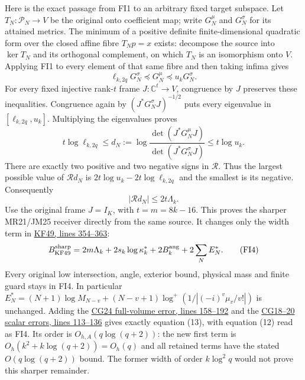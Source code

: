 \documentclass[11pt]{article}
\begin{document}
Here is the exact passage from FI1 to an arbitrary fixed target subspace. Let \(T_N:\mathcal P_N\to V\) be the original onto coefficient map; write \(G_N^{\mu}\) and \(G_N^\sigma\) for its attained metrics. The minimum of a positive definite finite-dimensional quadratic form over the closed affine fibre \(T_Np=x\) exists: decompose the source into \(\ker T_N\) and its orthogonal complement, on which \(T_N\) is an isomorphism onto \(V\). Applying FI1 to every element of that same fibre and then taking infima gives \[
 \ell_{k,2q}G_N^\sigma\preceq G_N^\mu\preceq u_kG_N^\sigma.
 \tag{FI2}
\] For every fixed injective rank-\(t\) frame \(J:\mathbb C^t\to V\), congruence by \(J\) preserves these inequalities. Congruence again by \((J^*G_N^\sigma J)^{-1/2}\) puts every eigenvalue in \([\ell_{k,2q},u_k]\). Multiplying the eigenvalues proves \[
 t\log\ell_{k,2q}\le d_N:=\log\frac{\det(J^*G_N^\mu J)}{\det(J^*G_N^\sigma J)}\le t\log u_k.
\] There are exactly two positive and two negative signs in \(\mathcal R\). Thus the largest possible value of \(\mathcal R d_N\) is \(2t\log u_k-2t\log\ell_{k,2q}\) and the smallest is its negative. Consequently \[
 |\mathcal R d_N|\le2t\Lambda_k.\tag{FI3}
\] Use the original frame \(J=I_K\), with \(t=m=8k-16\). This proves the sharper MR21/JM25 receiver directly from the same source. It changes only the width term in \href{https://github.com/KokunoYumeto/zeta-function-research-reader/blob/0fd693c844aad9117e30ec447c59864a28af10f3/workbenches/splitzero-tandem/continuations/20260921-native-spectral-real-pair/003/ACTUAL_KERNEL_FILTRATION_AND_GRAPH.tex\#L354}{KF49, lines 354--363}: \[
 B_{\rm KF49}^{\rm sharp}=2m\Lambda_k+2s_k\log\kappa_k^*+2B_k^{\rm ang}+2\sum_NE_N^*.
 \tag{FI4}
\] Every original low intersection, angle, exterior bound, physical mass and finite guard stays in FI4. In particular \(E_N^*=(N+1)\log M_{N-v}+(N-v+1)\log^+(1/|(-i)^v\mu_v/v!|)\) is unchanged. Adding the \href{https://github.com/KokunoYumeto/zeta-function-research-reader/blob/0fd693c844aad9117e30ec447c59864a28af10f3/workbenches/splitzero-tandem/continuations/20260921-native-spectral-real-pair/003/COMPLETE_CONDUCTOR_GRAPH_METRIC.tex\#L158}{CG24 full-volume error, lines 158--192} and the \href{https://github.com/KokunoYumeto/zeta-function-research-reader/blob/0fd693c844aad9117e30ec447c59864a28af10f3/workbenches/splitzero-tandem/continuations/20260921-native-spectral-real-pair/003/COMPLETE_CONDUCTOR_GRAPH_METRIC.tex\#L113}{CG18--20 scalar errors, lines 113--136} gives exactly equation (13), with equation (12) read as FI4. Its order is \(O_{h,A}(q\log(q+2))\): the new first term is \(O_h(k^2+k\log(q+2))=O_h(q)\) and all retained terms have the stated \(O(q\log(q+2))\) bound. The former width of order \(k\log^2q\) would not prove this sharper remainder.
\end{document}
